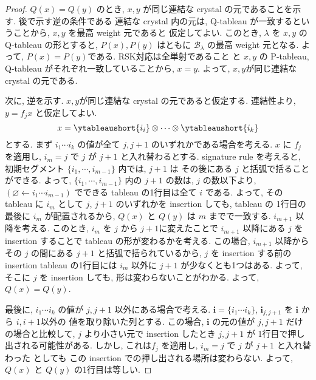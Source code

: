\documentclass[
  a4paper, 
  12pt,
  ja=standard,
  xelatex,
  left=30truemm,
  right=30truemm,
  titlepage 
]{bxjsarticle}
\theoremstyle{definition}
\begin{document}
\begin{proof}
  $Q(x) = Q(y)$ のとき, $x, y$ が同じ連結な crystal の元であることを示す. 後で示す逆の条件である
  連結な crystal 内の元は, Q-tableau が一致するということから, $x, y$ を最高 weight 元であると
  仮定してよい. このとき, $\lambda$ を $x, y$ の Q-tableau の形とすると, $P(x), P(y)$ はともに
  $\mathcal{B}_{\lambda}$ の最高 weight 元となる. よって, $P(x) = P(y)$である. RSK対応は全単射であること
  と $x, y$ の P-tableau, Q-tableau がそれぞれ一致していることから, $x = y$. よって, $x, y$が同じ連結な crystal の元である.

  次に, 逆を示す. $x, y$が同じ連結な crystal の元であると仮定する. 連結性より, $ y = f_j x$ と仮定してよい.
  $$x = \ytableaushort{{i_i}} \otimes \cdots \otimes \ytableaushort{{i_k}}$$
  とする. まず $i_1 \cdots i_k$ の値が全て $j, j + 1$ のいずれかである場合を考える.
  $x$ に $f_j$ を適用し, $i_m = j$ で $j$ が $j + 1$ と入れ替わるとする. signature rule を考えると, 
  初期セグメント $\{i_1, \cdots, i_{m - 1} \}$ 内では, $j + 1$ は その後にある $j$ と括弧で括ることができる.
  よって, $\{i_1, \cdots, i_{m - 1} \}$ 内の $j + 1$ の数は, $j$ の数以下より,
  $(\varnothing \leftarrow  i_1 \cdots i_{m - 1})$ でできる tableau の1行目は全て $i$ である. よって,
  その tableau に $i_m$ として $j$, $j + 1$ のいずれかを insertion しても, tableau の 1行目の最後に $i_m$ が配置されるから, 
  $Q(x)$ と $Q(y)$ は $m$ までで一致する. $i_{m + 1}$ 以降を考える. このとき, $i_m$ を $j$ から $j + 1$に変えたことで
  $i_{m + 1}$ 以降にある $j$ を insertion することで tableau の形が変わるかを考える. この場合, $i_{m + 1}$ 以降から その $j$
  の間にある $j + 1$ と括弧で括られているから, $j$ を insertion する前の insertion tableau の1行目には $i_m$ 以外に $j + 1$
  が少なくとも1つはある. よって, そこに $j$ を insertion しても, 形は変わらないことがわかる. よって, $Q(x) = Q(y)$.

  最後に, $i_1 \cdots i_k$ の値が $j, j + 1$ 以外にある場合で考える.
  $\mathbf{i} = \{ i_1 \cdots i_k \}$, $\mathbf{i}_{j, j + 1}$ を $\mathbf{i}$ から $i, i + 1$以外の
  値を取り除いた列とする. この場合, $\mathbf{i}$ の元の値が $j, j + 1$ だけの場合と比較して, $j$ より小さい元で
  insertion したとき $j, j + 1$ が 1行目で押し出される可能性がある. しかし, これは$f_j$ を適用し, $i_m = j$ で $j$ が $j + 1$ と入れ替わった
  としても この insertion での押し出される場所は変わらない. よって, $Q(x)$ と $Q(y)$ の1行目は等しい.


\end{proof}
\end{document}
